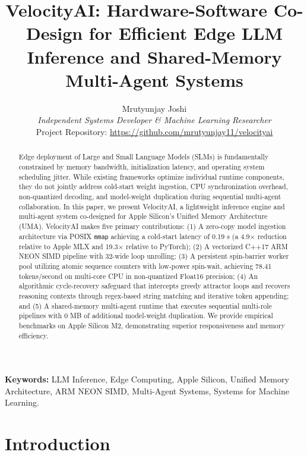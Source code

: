 \documentclass[a4paper,twocolumn,10pt]{article}
\begin{document}
\title{VelocityAI: Hardware-Software Co-Design for Efficient Edge LLM Inference and Shared-Memory Multi-Agent Systems}

\author{Mrutyunjay Joshi \\ \textit{Independent Systems Developer \& Machine Learning Researcher} \\ Project Repository: \url{https://github.com/mrutyunjay11/velocityai}}

\maketitle

\begin{abstract}
Edge deployment of Large and Small Language Models (SLMs) is fundamentally constrained by memory bandwidth, initialization latency, and operating system scheduling jitter. While existing frameworks optimize individual runtime components, they do not jointly address cold-start weight ingestion, CPU synchronization overhead, non-quantized decoding, and model-weight duplication during sequential multi-agent collaboration. In this paper, we present VelocityAI, a lightweight inference engine and multi-agent system co-designed for Apple Silicon's Unified Memory Architecture (UMA). VelocityAI makes five primary contributions: (1) A zero-copy model ingestion architecture via POSIX \texttt{mmap} achieving a cold-start latency of 0.19 s (a 4.9$\times$ reduction relative to Apple MLX and 19.3$\times$ relative to PyTorch); (2) A vectorized C++17 ARM NEON SIMD pipeline with 32-wide loop unrolling; (3) A persistent spin-barrier worker pool utilizing atomic sequence counters with low-power spin-wait, achieving 78.41 tokens/second on multi-core CPU in non-quantized Float16 precision; (4) An algorithmic cycle-recovery safeguard that intercepts greedy attractor loops and recovers reasoning contexts through regex-based string matching and iterative token appending; and (5) A shared-memory multi-agent runtime that executes sequential multi-role pipelines with 0 MB of additional model-weight duplication. We provide empirical benchmarks on Apple Silicon M2, demonstrating superior responsiveness and memory efficiency.
\end{abstract}

\textbf{Keywords:}
LLM Inference, Edge Computing, Apple Silicon, Unified Memory Architecture, ARM NEON SIMD, Multi-Agent Systems, Systems for Machine Learning.

\section{Introduction}
\end{document}
